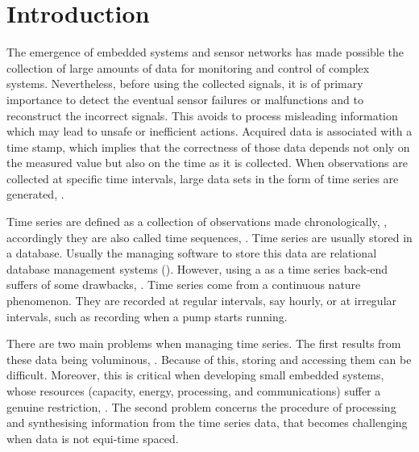 \section{Introduction}


The emergence of embedded systems and sensor networks has made
possible the collection of large amounts of data for monitoring and
control of complex systems.
%
Nevertheless, before using the collected signals, it is of primary
importance to detect the eventual sensor failures or malfunctions and
to reconstruct the incorrect signals. This avoids to process
misleading information which may lead to unsafe or inefficient
actions. Acquired data is associated with a time stamp, which implies
that the correctness of those data depends not only on the measured
value but also on the time as it is collected. When observations are
collected at specific time intervals, large data sets in the form of
time series are generated, \cite{basu07:_autom}.

Time series are defined as a collection of observations made
chronologically, \cite{fu11}, accordingly they are also called time
sequences, \cite{last:hetland}.  Time series are usually stored in a
database. Usually the managing software to store this data are
relational database management systems (). However, using
a  as a time series back-end suffers of some drawbacks,
\cite{dreyer94,schmidt95,stonebraker09:scidb,zhang11}. Time series
come from a continuous nature phenomenon. They are recorded at regular
intervals, say hourly, or at irregular intervals, such as recording
when a pump starts running.

There are two main problems when managing time series. The first
results from these data being voluminous, \cite{fu11}. Because of
this, storing and accessing them can be difficult. Moreover, this is
critical when developing small embedded systems, whose resources
(capacity, energy, processing, and communications) suffer a genuine
restriction, \cite{yaogehrke02}.  The second problem concerns the
procedure of processing and synthesising information from the time
series data, that becomes challenging when data is not equi-time
spaced.



